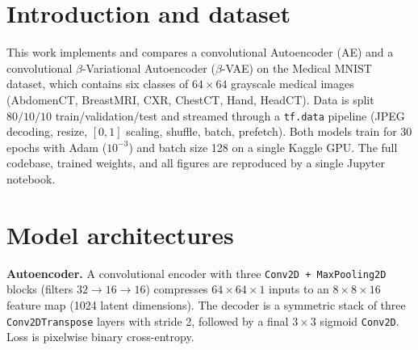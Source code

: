 \documentclass[10pt,a4paper,twocolumn]{article}
\begin{document}

\section{Introduction and dataset}
This work implements and compares a convolutional Autoencoder (AE) and a convolutional $\beta$-Variational Autoencoder ($\beta$-VAE) on the Medical MNIST dataset, which contains six classes of $64{\times}64$ grayscale medical images (AbdomenCT, BreastMRI, CXR, ChestCT, Hand, HeadCT). Data is split $80/10/10$ train/validation/test and streamed through a \texttt{tf.data} pipeline (JPEG decoding, resize, $[0,1]$ scaling, shuffle, batch, prefetch). Both models train for 30 epochs with Adam ($10^{-3}$) and batch size 128 on a single Kaggle GPU. The full codebase, trained weights, and all figures are reproduced by a single Jupyter notebook.

\section{Model architectures}
\textbf{Autoencoder.} A convolutional encoder with three \texttt{Conv2D + MaxPooling2D} blocks (filters $32{\to}16{\to}16$) compresses $64{\times}64{\times}1$ inputs to an $8{\times}8{\times}16$ feature map (1024 latent dimensions). The decoder is a symmetric stack of three \texttt{Conv2DTranspose} layers with stride 2, followed by a final $3{\times}3$ sigmoid \texttt{Conv2D}. Loss is pixelwise binary cross-entropy.
\end{document}

